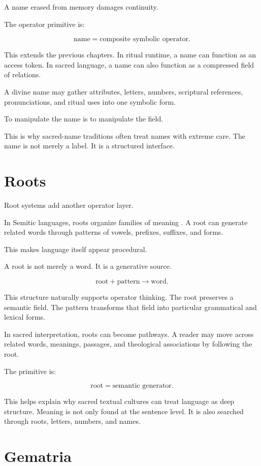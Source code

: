 \documentclass[11pt]{book}
\begin{document}
A name erased from memory damages continuity.

The operator primitive is:

\[
\text{name} = \text{composite symbolic operator}.
\]

This extends the previous chapters. In ritual runtime, a name can function as an access token. In sacred language, a name can also function as a compressed field of relations.

A divine name may gather attributes, letters, numbers, scriptural references, pronunciations, and ritual uses into one symbolic form.

To manipulate the name is to manipulate the field.

This is why sacred-name traditions often treat names with extreme care. The name is not merely a label. It is a structured interface.

\section{Roots}

Root systems add another operator layer.

In Semitic languages, roots organize families of meaning \cite{Eco1995SearchPerfectLanguage,Scholem1974Kabbalah}. A root can generate related words through patterns of vowels, prefixes, suffixes, and forms.

This makes language itself appear procedural.

A root is not merely a word. It is a generative source.

\[
\text{root} + \text{pattern} \rightarrow \text{word}.
\]

This structure naturally supports operator thinking. The root preserves a semantic field. The pattern transforms that field into particular grammatical and lexical forms.

In sacred interpretation, roots can become pathways. A reader may move across related words, meanings, passages, and theological associations by following the root.

The primitive is:

\[
\text{root} = \text{semantic generator}.
\]

This helps explain why sacred textual cultures can treat language as deep structure. Meaning is not only found at the sentence level. It is also searched through roots, letters, numbers, and names.

\section{Gematria}
\end{document}

